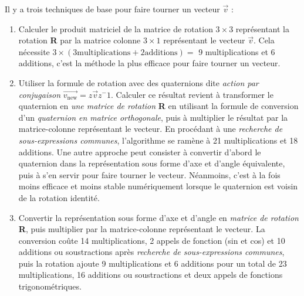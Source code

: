 Il y a trois techniques de base pour faire tourner un vecteur $\vec{v}$ :
\begin{enumerate}
	\item Calculer le produit matriciel de la matrice de rotation $3\times3$ représentant la 
	rotation \textbf{R} par la matrice colonne $3\times1$ représentant le vecteur $\vec{v}$.
	Cela nécessite $3 \times (3 \text{multiplications} + 2 \text{additions}) = $ 
	9 multiplications et 6 additions, c'est la méthode la plus efficace pour faire tourner 
	un vecteur.
	
	\item Utiliser la formule de rotation avec des quaternions dite \emph{action par conjugaison} $\vec{v_{\text{new}}} = z\vec{v}z^-1$.  Calculer ce résultat 
	revient à transformer le quaternion en \emph{une matrice de rotation} 
	\textbf{R}  en utilisant la formule de conversion d'un \emph{quaternion 
	en matrice orthogonale}, puis à multiplier le résultat par la
	matrice-colonne représentant le vecteur. 
	En procédant à une \emph{recherche de sous-expressions communes}, l'algorithme 
	se ramène à 21 multiplications et 18 additions. Une autre approche peut 
	consister à convertir d'abord le quaternion dans la représentation sous 
	forme d'axe et d'angle équivalente, puis à s'en servir pour faire tourner 
	le vecteur. Néanmoins, c'est à la fois moins efficace et moins stable 
	numériquement lorsque le quaternion est voisin de la rotation identité.
	
	\item Convertir la représentation sous forme d'axe et d'angle en 
	\emph{matrice de rotation} \textbf{R}, puis multiplier par la matrice-colonne 
	représentant le vecteur. La conversion coûte 14 multiplications, 
	2 appels de fonction (sin et cos) et 10 additions ou soustractions 
	après \emph{recherche de sous-expressions communes}, puis la rotation ajoute 
	9 multiplications et 6 additions pour un total de 23 multiplications, 
	16 additions ou soustractions et deux appels de fonctions trigonométriques.
\end{enumerate}